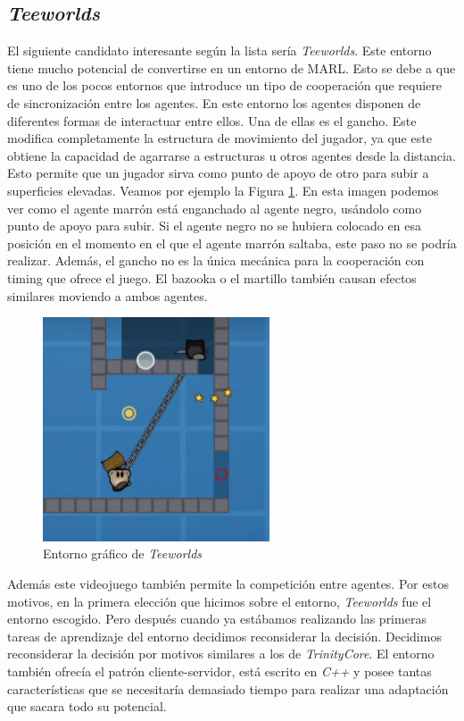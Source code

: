 \subsection{\textit{Teeworlds}}

El siguiente candidato interesante según la lista sería \textit{Teeworlds}. Este entorno tiene mucho potencial de convertirse en un entorno de MARL. Esto se debe a que es uno de los pocos entornos que introduce un tipo de cooperación que requiere de sincronización entre los agentes. En este entorno los agentes disponen de diferentes formas de interactuar entre ellos. Una de ellas es el gancho. Este modifica completamente la estructura de movimiento del jugador, ya que este obtiene la capacidad de agarrarse a estructuras u otros agentes desde la distancia. Esto permite que un jugador sirva como punto de apoyo de otro para subir a superficies elevadas. Veamos por ejemplo la Figura \ref {fig:teeworlds-ex}. En esta imagen podemos ver como el agente marrón está enganchado al agente negro, usándolo como punto de apoyo para subir. Si el agente negro no se hubiera colocado en esa posición en el momento en el que el agente marrón saltaba, este paso no se podría realizar. Además, el gancho no es la única mecánica para la cooperación con timing que ofrece el juego. El bazooka o el martillo también causan efectos similares moviendo a ambos agentes.
\begin{figure}[ht]
    \centering
    \includegraphics[width=0.6\textwidth]{img/teewords-ex.png}
    \caption{Entorno gráfico de \textit{Teeworlds} \cite {teeworlds}}
    \label{fig:teeworlds-ex}
\end{figure}

Además este videojuego también permite la competición entre agentes. Por estos motivos, en la primera elección que hicimos sobre el entorno, \textit{Teeworlds} fue el entorno escogido. Pero después cuando ya estábamos realizando las primeras tareas de aprendizaje del entorno decidimos reconsiderar la decisión. Decidimos reconsiderar la decisión por motivos similares a los de \textit{TrinityCore}. El entorno también ofrecía el patrón cliente-servidor, está escrito en \textit{C++} y posee tantas características que se necesitaría demasiado tiempo para realizar una adaptación que sacara todo su potencial. 

